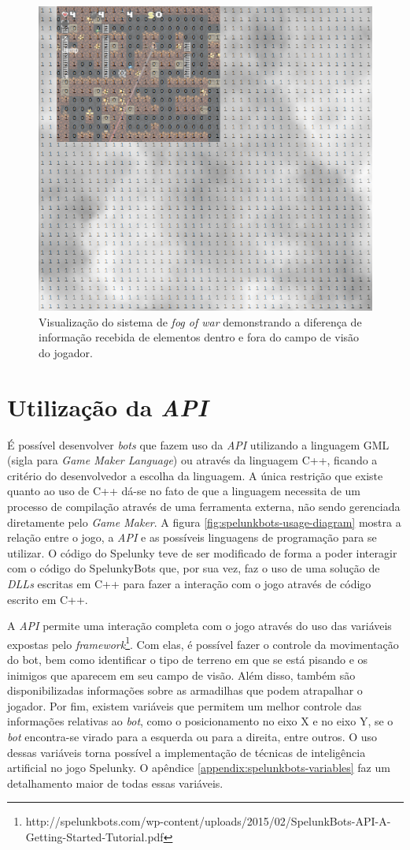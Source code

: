 \begin{figure}[htb!]
\centering
\includegraphics[width=.65\textwidth]{fig/spelunkbots-fow.png}
\caption {\label{fig:spelunkbots-fow}Visualização do sistema de \textit{fog of
war} demonstrando a diferença de informação recebida de elementos dentro e fora
do campo de visão do jogador.}
\end{figure}

\section{Utilização da \textit{API}}

É possível desenvolver \textit{bots} que fazem uso da \textit{API}
utilizando a linguagem GML (sigla para \textit{Game Maker Language}) ou
através da linguagem C++, ficando a critério do desenvolvedor a escolha da
linguagem. A única restrição que existe quanto ao uso de C++ dá-se no fato
de que a linguagem necessita de um processo de compilação através de uma
ferramenta externa, não sendo gerenciada diretamente pelo \textit{Game
Maker}. A figura \ref{fig:spelunkbots-usage-diagram} mostra a relação entre
o jogo, a \textit{API} e as possíveis linguagens de programação para se
utilizar. O código do Spelunky teve de ser modificado de forma a poder
interagir com o código do SpelunkyBots que, por sua vez, faz o uso de uma
solução de \textit{DLLs} escritas em C++ para fazer a interação com o jogo
através de código escrito em C++.

A \textit{API} permite uma interação completa com o jogo através do uso
das variáveis expostas pelo
\textit{framework}\footnote{http://spelunkbots.com/wp-content/uploads/2015/02/SpelunkBots-API-A-Getting-Started-Tutorial.pdf}.
Com elas, é possível fazer o controle da movimentação do bot, bem
como identificar o tipo de terreno em que se está pisando e os inimigos que
aparecem em seu campo de visão. Além disso, também são disponibilizadas
informações sobre as armadilhas que podem atrapalhar o jogador. Por fim,
existem variáveis que permitem um melhor controle das informações relativas ao
\textit{bot}, como o posicionamento no eixo X e no eixo Y, se o \textit{bot}
encontra-se virado para a esquerda ou para a direita, entre outros. O uso dessas
variáveis torna possível a implementação de técnicas de inteligência artificial
no jogo Spelunky. O apêndice \ref{appendix:spelunkbots-variables} faz um
detalhamento maior de todas essas variáveis.
